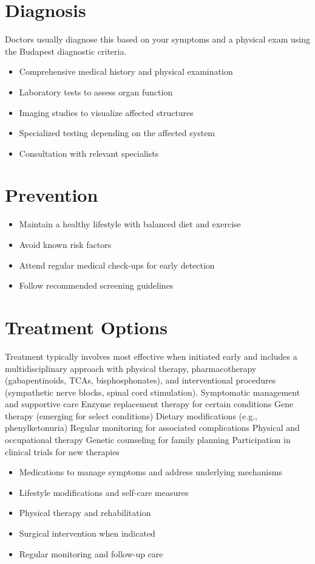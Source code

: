 \section{Diagnosis}
Doctors usually diagnose this based on your symptoms and a physical exam using the Budapest diagnostic criteria.

\begin{itemize}[noitemsep]
  \item Comprehensive medical history and physical examination
  \item Laboratory tests to assess organ function
  \item Imaging studies to visualize affected structures
  \item Specialized testing depending on the affected system
  \item Consultation with relevant specialists
\end{itemize}
\section{Prevention}
\begin{itemize}[noitemsep]
  \item Maintain a healthy lifestyle with balanced diet and exercise
  \item Avoid known risk factors
  \item Attend regular medical check-ups for early detection
  \item Follow recommended screening guidelines
\end{itemize}
\section{Treatment Options}
Treatment typically involves most effective when initiated early and includes a multidisciplinary approach with physical therapy, pharmacotherapy (gabapentinoids, TCAs, bisphosphonates), and interventional procedures (sympathetic nerve blocks, spinal cord stimulation). Symptomatic management and supportive care Enzyme replacement therapy for certain conditions Gene therapy (emerging for select conditions) Dietary modifications (e.g., phenylketonuria) Regular monitoring for associated complications Physical and occupational therapy Genetic counseling for family planning Participation in clinical trials for new therapies

\begin{itemize}[noitemsep]
  \item Medications to manage symptoms and address underlying mechanisms
  \item Lifestyle modifications and self-care measures
  \item Physical therapy and rehabilitation
  \item Surgical intervention when indicated
  \item Regular monitoring and follow-up care
\end{itemize}
